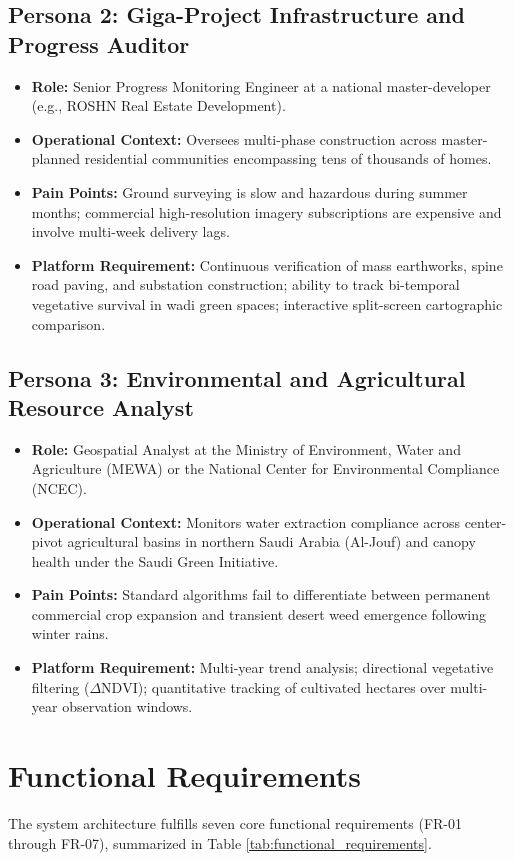 \subsection{Persona 2: Giga-Project Infrastructure and Progress Auditor}
\begin{itemize}
    \item \textbf{Role:} Senior Progress Monitoring Engineer at a national master-developer (e.g., ROSHN Real Estate Development).
    \item \textbf{Operational Context:} Oversees multi-phase construction across master-planned residential communities encompassing tens of thousands of homes.
    \item \textbf{Pain Points:} Ground surveying is slow and hazardous during summer months; commercial high-resolution imagery subscriptions are expensive and involve multi-week delivery lags.
    \item \textbf{Platform Requirement:} Continuous verification of mass earthworks, spine road paving, and substation construction; ability to track bi-temporal vegetative survival in wadi green spaces; interactive split-screen cartographic comparison.
\end{itemize}

\subsection{Persona 3: Environmental and Agricultural Resource Analyst}
\begin{itemize}
    \item \textbf{Role:} Geospatial Analyst at the Ministry of Environment, Water and Agriculture (MEWA) or the National Center for Environmental Compliance (NCEC).
    \item \textbf{Operational Context:} Monitors water extraction compliance across center-pivot agricultural basins in northern Saudi Arabia (Al-Jouf) and canopy health under the Saudi Green Initiative.
    \item \textbf{Pain Points:} Standard algorithms fail to differentiate between permanent commercial crop expansion and transient desert weed emergence following winter rains.
    \item \textbf{Platform Requirement:} Multi-year trend analysis; directional vegetative filtering ($\Delta\text{NDVI}$); quantitative tracking of cultivated hectares over multi-year observation windows.
\end{itemize}

\section{Functional Requirements}
\label{sec:req_functional}
The system architecture fulfills seven core functional requirements (FR-01 through FR-07), summarized in Table \ref{tab:functional_requirements}.

